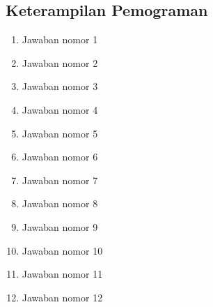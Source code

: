 \subsection{Keterampilan Pemograman}
\begin{enumerate}
\item Jawaban nomor 1


\item Jawaban nomor 2


\item Jawaban nomor 3


\item Jawaban nomor 4


\item Jawaban nomor 5


\item Jawaban nomor 6


\item Jawaban nomor 7


\item Jawaban nomor 8


\item Jawaban nomor 9


\item Jawaban nomor 10


\item Jawaban nomor 11


\item Jawaban nomor 12

\end{enumerate}

